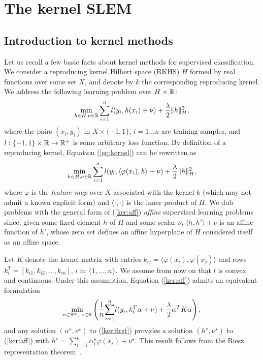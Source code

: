 \section{The kernel SLEM}
\label{nonlinear SLEM}

\subsection{Introduction to kernel methods}\label{kernel:review}
Let us recall a few basic facts about kernel methods for supervised
classification. We consider a reproducing kernel Hilbert space (RKHS)
$H$ formed by real functions over some set
$X$, and denote by $k$ the corresponding reproducing kernel.  We
address the following learning problem over $H\times\mathbb R$:
\begin{equation}
\min_{h\in H,\nu\in\mathbb R}
\sum_{i=1}^n l(y_i,h(x_i)+\nu) + \frac{\lambda}{2}\|h\|_H^2,
\label{eq:kernel}
\end{equation}  
where the pairs $(x_i,y_i)$ in $X\times \{-1,1\}$, $i=1\dots n$ are training samples, and $l: \{-1,1\}\times \mathbb R\rightarrow\mathbb R^+$ is some arbitrary loss function. 
By definition of a reproducing kernel,
Equation (\ref{eq:kernel}) can be rewritten as
\begin{equation}
\min_{h\in H,\nu\in\mathbb R}
\sum_{i=1}^n l(y_i,\langle \varphi(x_i),h\rangle+\nu) +
\dfrac{\lambda}{2}\|h\|_H^2,
\label{ker:aff}
\end{equation} 
where $\varphi$ is the {\em feature map} over $X$ associated with the
kernel $k$ (which may not admit a known explicit form) and $\langle \cdot, \cdot \rangle$ is the inner product of $H$. We dub problems with the general form of (\ref{ker:aff}) {\em affine}
supervised learning problems since, given some fixed element $h$ of
$H$ and some scalar $\nu$, $\langle h,h'\rangle+\nu$ is an affine function of $h'$,
whose zero set defines an affine hyperplane of $H$ considered itself
as an affine space.

Let $K$ denote the kernel matrix with entries $k_{ij}=\langle\varphi(x_i),
\varphi(x_j)\rangle$ and rows $k_i^T=[k_{i1}, k_{i2},...,k_{in}]$, $i$ in $\{1,\ldots,n\}$.  We assume from now on that $l$ is convex and continuous. Under this assumption, Equation (\ref{ker:aff}) admits an equivalent formulation
\begin{align}
\min_{\alpha\in\mathbb R^{n}, \ \nu\in\mathbb R} \left(\dfrac{1}{n}\displaystyle{\sum_{i=1}^n} l(y_i, k_i^T\alpha+\nu)  +\dfrac{\lambda}{2}\alpha^TK\alpha\right), \label{ker:first}
\end{align}
and any solution $(\alpha^\star,\nu^\star)$ to (\ref{ker:first})
provides
a solution $(h^\star,\nu^\star)$ to (\ref{ker:aff}) with
$h^\star=\sum_{i=1}^n \alpha_i^\star\varphi(x_i)+\nu^\star$. This result follows from the Riesz representation theorem~\cite{SHS01,Wahba90}.



